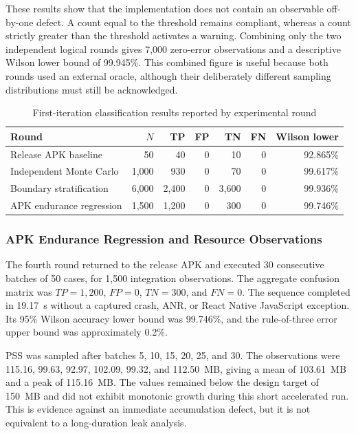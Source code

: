 These results show that the implementation does not contain an observable off-by-one defect. A count equal to the threshold remains compliant, whereas a count strictly greater than the threshold activates a warning. Combining only the two independent logical rounds gives 7,000 zero-error observations and a descriptive Wilson lower bound of 99.945\%. This combined figure is useful because both rounds used an external oracle, although their deliberately different sampling distributions must still be acknowledged.

\begin{table}[H]
\centering
\caption{First-iteration classification results reported by experimental round}
\label{tab:ch5-first-iteration}
\small
\begin{tabular}{lrrrrrr}
\toprule
\textbf{Round} & \textbf{$N$} & \textbf{TP} & \textbf{FP} & \textbf{TN} & \textbf{FN} & \textbf{Wilson lower} \\
\midrule
Release APK baseline & 50 & 40 & 0 & 10 & 0 & 92.865\% \\
Independent Monte Carlo & 1,000 & 930 & 0 & 70 & 0 & 99.617\% \\
Boundary stratification & 6,000 & 2,400 & 0 & 3,600 & 0 & 99.936\% \\
APK endurance regression & 1,500 & 1,200 & 0 & 300 & 0 & 99.746\% \\
\bottomrule
\end{tabular}
\end{table}

\subsubsection{APK Endurance Regression and Resource Observations}

The fourth round returned to the release APK and executed 30 consecutive batches of 50 cases, for 1,500 integration observations. The aggregate confusion matrix was $TP=1,200$, $FP=0$, $TN=300$, and $FN=0$. The sequence completed in 19.17~s without a captured crash, ANR, or React Native JavaScript exception. Its 95\% Wilson accuracy lower bound was 99.746\%, and the rule-of-three error upper bound was approximately 0.2\%.

PSS was sampled after batches 5, 10, 15, 20, 25, and 30. The observations were 115.16, 99.63, 92.97, 102.09, 99.32, and 112.50~MB, giving a mean of 103.61~MB and a peak of 115.16~MB. The values remained below the design target of 150~MB and did not exhibit monotonic growth during this short accelerated run. This is evidence against an immediate accumulation defect, but it is not equivalent to a long-duration leak analysis.

